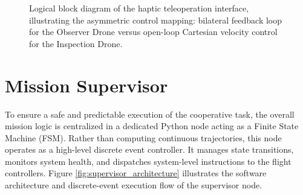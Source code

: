 \begin{enumerate}
\begin{figure}[h!]
{
    }
    \caption{Logical block diagram of the haptic teleoperation interface, illustrating the asymmetric control mapping: bilateral feedback loop for the Observer Drone versus open-loop Cartesian velocity control for the Inspection Drone.}
    \label{fig:haptic_mapping_logic}
\end{figure}

\end{enumerate}
\section{Mission Supervisor}
To ensure a safe and predictable execution of the cooperative task, the overall mission logic is centralized in a dedicated Python node acting as a Finite State Machine (FSM). Rather than computing continuous trajectories, this node operates as a high-level discrete event controller. It manages state transitions, monitors system health, and dispatches system-level instructions to the flight controllers. Figure \ref{fig:supervisor_architecture} illustrates the software architecture and discrete-event execution flow of the supervisor node.

